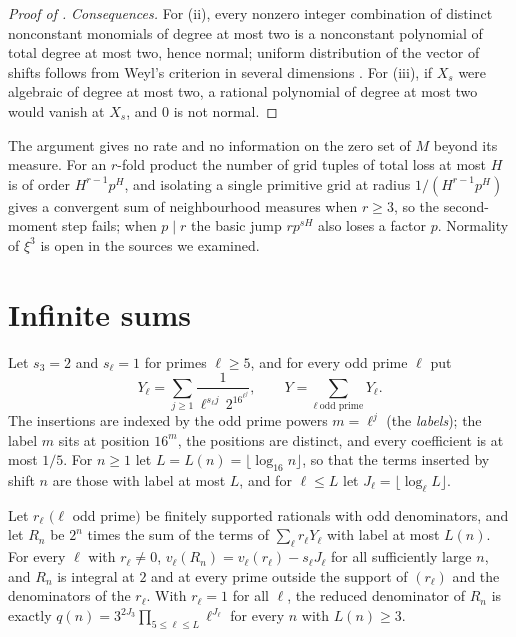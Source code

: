 \documentclass[11pt]{article}
\begin{document}
\begin{proof}[Proof of ]
\emph{Consequences.} For (ii), every nonzero integer combination of distinct nonconstant monomials of
degree at most two is a nonconstant polynomial of total degree at most two, hence normal; uniform
distribution of the vector of shifts follows from Weyl's criterion in several dimensions \cite[Chapter~1,
Theorem~6.2, p.~49]{KN}. For (iii), if $X_s$ were algebraic of degree at most two, a rational polynomial
of degree at most two would vanish at $X_s$, and $0$ is not normal.
\end{proof}

\begin{remark}[Scope]\label{rem:quadscope}
The argument gives no rate and no information on the zero set of $M$ beyond its measure. For an
$r$-fold product the number of grid tuples of total loss at most $H$ is of order $H^{r-1}p^H$, and
isolating a single primitive grid at radius $1/(H^{r-1}p^H)$ gives a convergent sum of neighbourhood
measures when $r\ge3$, so the second-moment step fails; when $p\mid r$ the basic jump $rp^{sH}$ also loses
a factor $p$. Normality of $\xi^3$ is open in the sources we examined.
\end{remark}

\section{Infinite sums}\label{sec:sums}

Let $s_3=2$ and $s_\ell=1$ for primes $\ell\ge5$, and for every odd prime $\ell$ put
\[
Y_\ell=\sum_{j\ge1}\frac{1}{\ell^{s_\ell j}\,2^{16^{\ell^j}}},\qquad
Y=\sum_{\ell\ \text{odd prime}}Y_\ell .
\]
The insertions are indexed by the odd prime powers $m=\ell^j$ (the \emph{labels}); the label $m$ sits
at position $16^m$, the positions are distinct, and every coefficient is at most $1/5$. For $n\ge1$ let
$L=L(n)=\lfloor\log_{16}n\rfloor$, so that the terms inserted by shift $n$ are those with label at most
$L$, and for $\ell\le L$ let $J_\ell=\lfloor\log_\ell L\rfloor$.

\begin{lemma}\label{lem:Yden}
Let $r_\ell$ $(\ell$ odd prime$)$ be finitely supported rationals with odd denominators, and let $R_n$ be
$2^n$ times the sum of the terms of $\sum_\ell r_\ell Y_\ell$ with label at most $L(n)$. For every $\ell$
with $r_\ell\ne0$, $v_\ell(R_n)=v_\ell(r_\ell)-s_\ell J_\ell$ for all sufficiently large $n$, and $R_n$ is
integral at $2$ and at every prime outside the support of $(r_\ell)$ and the denominators of the
$r_\ell$. With $r_\ell=1$ for all $\ell$, the reduced denominator of $R_n$ is exactly
$q(n)=3^{2J_3}\prod_{5\le\ell\le L}\ell^{J_\ell}$ for every $n$ with $L(n)\ge3$.
\end{lemma}
\end{document}

